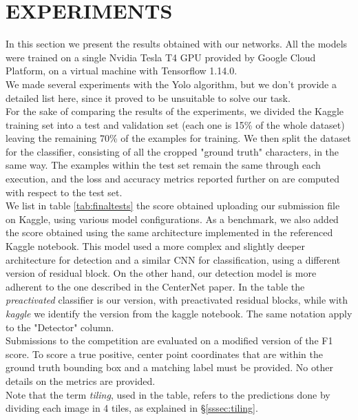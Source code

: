 \section{EXPERIMENTS}
\label{sec:experiments}

In this section we present the results obtained with our networks. All the models were trained on a single Nvidia Tesla T4 GPU provided by Google Cloud Platform, on a virtual machine with Tensorflow 1.14.0. \\
We made several experiments with the Yolo algorithm, but we don't provide a detailed list here, since it proved to be unsuitable to solve our task.\\
For the sake of comparing the results of the experiments, we divided the Kaggle training set into a test and validation set (each one is 15\% of the whole dataset) leaving the remaining 70\% of the examples for training. We then split the dataset for the classifier, consisting of all the cropped "ground truth" characters, in the same way. The examples within the test set remain the same through each execution, and the loss and accuracy metrics reported further on are computed with respect to the test set.\\
We list in table \ref{tab:finaltests} the score obtained uploading our submission file on Kaggle, using various model configurations. As a benchmark, we also added the score obtained using the same architecture implemented in the referenced Kaggle notebook. This model used a more complex and slightly deeper architecture for detection and a similar CNN for classification, using a different version of residual block. On the other hand, our detection model is more adherent to the one described in the CenterNet paper. In the table the \textit{preactivated} classifier is our version, with preactivated residual blocks, while with \textit{kaggle} we identify the version from the kaggle notebook. The same notation apply to the "Detector" column.\\
Submissions to the competition are evaluated on a modified version of the F1 score. To score a true positive, center point coordinates that are within the ground truth bounding box and a matching label must be provided. No other details on the metrics are provided.\\ Note that the term \textit{tiling}, used in the table, refers to the predictions done by dividing each image in 4 tiles, as explained in §\ref{sssec:tiling}.

